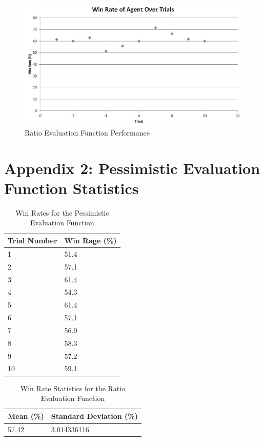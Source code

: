 \documentclass[12pt]{article}
\begin{document}
\begin{figure}[h]
\centering
\caption{Ratio Evaluation Function Performance}
\includegraphics[scale=0.71]{ratio-evaluation-function-results.JPG}
\end{figure}

\clearpage
\section{Appendix 2: Pessimistic Evaluation Function Statistics}
\begin{table}[h]
\centering
\caption{Win Rates for the Pessimistic Evaluation Function}
\label{pessimistic-label}
\begin{tabular}{@{}|l|l|@{}}
\toprule
Trial Number & Win Rage (\%) \\ \midrule
1            & 51.4          \\ \midrule
2            & 57.1          \\ \midrule
3            & 61.4          \\ \midrule
4            & 54.3          \\ \midrule
5            & 61.4          \\ \midrule
6            & 57.1          \\ \midrule
7            & 56.9          \\ \midrule
8            & 58.3          \\ \midrule
9            & 57.2          \\ \midrule
10           & 59.1          \\ \bottomrule
\end{tabular}
\end{table}

\begin{table}[h]
\centering
\caption{Win Rate Statistics for the Ratio Evaluation Function}
\label{ratio-stats}
\begin{tabular}{@{}|l|l|@{}}
\toprule
Mean (\%)& Standard Deviation (\%) \\ \midrule
57.42           & 3.014336116
\\ \bottomrule
\end{tabular}
\end{table}
\end{document}
